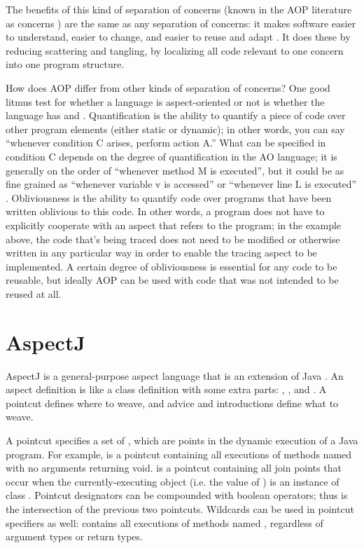 \documentclass[12pt]{article}
\begin{document}
The benefits of this kind of separation of concerns (known in the AOP
literature as  concerns \cite{AOP}) are the same
as any separation of concerns: it makes software easier to understand, 
easier to change, and easier to reuse and adapt \cite{MDSOC}.  It does 
these by reducing scattering and tangling, by localizing all code
relevant to one concern into one program structure.

How does AOP differ from other kinds of separation of concerns?  One
good litmus test for whether a language is aspect-oriented or not is
whether the language has  and 
\cite{ob-quant}.  Quantification is the ability to quantify a piece of 
code over other program elements (either static or dynamic); in other
words, you can say ``whenever condition C arises, perform action A.''
What can be specified in condition C depends on the degree of
quantification in the AO language; it is generally on the order of
``whenever method M is executed'', but it could be as fine grained as
``whenever variable v is accessed'' \cite{SOP} or ``whenever line L is
executed'' \cite{come-from}.  Obliviousness is the ability to quantify 
code over programs that have been written oblivious to this code.  In
other words, a program does not have to explicitly cooperate with an
aspect that refers to the program; in the example above, the code
that's being traced does not need to be modified or otherwise written
in any particular way in order to enable the tracing aspect to be
implemented.  A certain degree of obliviousness is essential for any
code to be reusable, but ideally AOP can be used with code that was
not intended to be reused at all.

\section{AspectJ}


AspectJ \cite{AspectJ} is a general-purpose aspect language that is an
extension of Java \cite{JLS}.  An aspect definition is like a class
definition with some extra parts: , , and 
.  A pointcut defines where to weave, and advice 
and introductions define what to weave.

A pointcut specifies a set of , which are points in
the dynamic execution of a Java program.  For example,
 is a pointcut containing all executions
of methods named  with no arguments returning void.
 is a pointcut containing all join points that
occur when the currently-executing object (i.e. the value of
) is an instance of class .  Pointcut
designators can be compounded with boolean operators; thus
 is the intersection of
the previous two pointcuts.  Wildcards can be used in pointcut
specifiers as well:  contains all
executions of methods named , regardless of argument types
or return types.
\end{document}
